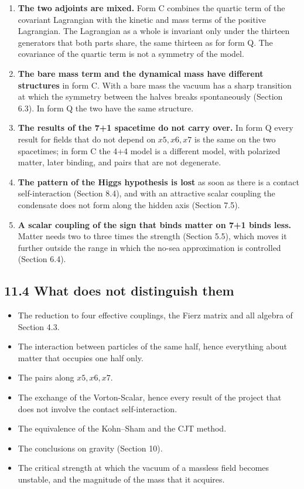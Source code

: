 \documentclass[
  10pt,
]{article}
\providecommand{\tightlist}{%
  \setlength{\itemsep}{0pt}\setlength{\parskip}{0pt}}
\begin{document}
\begin{enumerate}
\def\labelenumi{\arabic{enumi}.}
\tightlist
\item
  \textbf{The two adjoints are mixed.} Form C combines the quartic term
  of the covariant Lagrangian with the kinetic and mass terms of the
  positive Lagrangian. The Lagrangian as a whole is invariant only under
  the thirteen generators that both parts share, the same thirteen as
  for form Q. The covariance of the quartic term is not a symmetry of
  the model.
\item
  \textbf{The bare mass term and the dynamical mass have different
  structures} in form C. With a bare mass the vacuum has a sharp
  transition at which the symmetry between the halves breaks
  spontaneously (Section 6.3). In form Q the two have the same
  structure.
\item
  \textbf{The results of the 7+1 spacetime do not carry over.} In form Q
  every result for fields that do not depend on \(x5,x6,x7\) is the same
  on the two spacetimes; in form C the 4+4 model is a different model,
  with polarized matter, later binding, and pairs that are not
  degenerate.
\item
  \textbf{The pattern of the Higgs hypothesis is lost} as soon as there
  is a contact self-interaction (Section 8.4), and with an attractive
  scalar coupling the condensate does not form along the hidden axis
  (Section 7.5).
\item
  \textbf{A scalar coupling of the sign that binds matter on 7+1 binds
  less.} Matter needs two to three times the strength (Section 5.5),
  which moves it further outside the range in which the no-sea
  approximation is controlled (Section 6.4).
\end{enumerate}

\hypertarget{what-does-not-distinguish-them}{%
\subsection{11.4 What does not distinguish
them}\label{what-does-not-distinguish-them}}

\begin{itemize}
\tightlist
\item
  The reduction to four effective couplings, the Fierz matrix and all
  algebra of Section 4.3.
\item
  The interaction between particles of the same half, hence everything
  about matter that occupies one half only.
\item
  The pairs along \(x5,x6,x7\).
\item
  The exchange of the Vorton-Scalar, hence every result of the project
  that does not involve the contact self-interaction.
\item
  The equivalence of the Kohn--Sham and the CJT method.
\item
  The conclusions on gravity (Section 10).
\item
  The critical strength at which the vacuum of a massless field becomes
  unstable, and the magnitude of the mass that it acquires.
\end{itemize}
\end{document}
